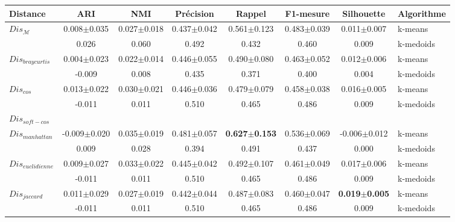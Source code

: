 \begin{table}[!htb]
	\scriptsize\centering
	\begin{tabular}{|l||c|c||c|c|c||c||l|}
		\hline
		Distance & ARI & NMI & Précision & Rappel & F1-mesure & Silhouette & Algorithme\\ \hline
		
		\multirow{2}{*}{$Dis_\mathcal{M}$} & 0.008$\pm$0.035 & 0.027$\pm$0.018 & 0.437$\pm$0.042 & 0.561$\pm$0.123 & 0.483$\pm$0.039 & 0.011$\pm$0.007 & k-means \\
		& 0.026 & 0.060 & 0.492 & 0.432 & 0.460 & 0.009 & k-medoids \\ \hline
		
		
		\multirow{2}{*}{$Dis_{braycurtis}$} & 0.004$\pm$0.023 & 0.022$\pm$0.014 & 0.446$\pm$0.055 & 0.490$\pm$0.080 & 0.463$\pm$0.052 & 0.012$\pm$0.006 & k-means \\
		 & -0.009 & 0.008 & 0.435 & 0.371 & 0.400 & 0.004 & k-medoids \\ \hline
		
		\multirow{2}{*}{$Dis_{cos}$} & 0.013$\pm$0.022 & 0.030$\pm$0.021 & 0.446$\pm$0.036 & 0.479$\pm$0.079 & 0.458$\pm$0.038 & 0.016$\pm$0.005 & k-means \\
		& -0.011 & 0.011 & 0.510 & 0.465 & 0.486 & 0.009 & k-medoids \\ \hline
		
		\multirow{2}{*}{$Dis_{soft-cos}$}  &&&&&&&  \\  
		 &&&&&&&  \\ \hline  		
		
		\multirow{2}{*}{$Dis_{manhattan}$} & -0.009$\pm$0.020 & 0.035$\pm$0.019 & 0.481$\pm$0.057 & \textbf{0.627$\pm$0.153} & 0.536$\pm$0.069 & -0.006$\pm$0.012 & k-means \\
		& 0.009 & 0.028 & 0.394 & 0.491 & 0.437 & 0.000 & k-medoids \\ \hline
		
		\multirow{2}{*}{$Dis_{euclidienne}$} & 0.009$\pm$0.027 & 0.033$\pm$0.022 & 0.445$\pm$0.042 & 0.492$\pm$0.107 & 0.461$\pm$0.049 & 0.017$\pm$0.006 & k-means \\
		& -0.011 & 0.011 & 0.510 & 0.465 & 0.486 & 0.009 & k-medoids \\ \hline
		
		\multirow{2}{*}{$Dis_{jaccard}$} & 0.011$\pm$0.029 & 0.027$\pm$0.019 & 0.442$\pm$0.044 & 0.487$\pm$0.083 & 0.460$\pm$0.047 & \textbf{0.019$\pm$0.005} & k-means \\
		& -0.011 & 0.011 & 0.510 & 0.465 & 0.486 & 0.009 & k-medoids \\ \hline
		

\end{tabular}
\end{table}
